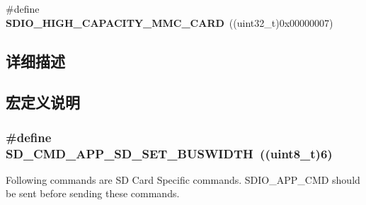 \begin{DoxyCompactItemize}
\item 
\#define {\bfseries S\+D\+I\+O\+\_\+\+H\+I\+G\+H\+\_\+\+C\+A\+P\+A\+C\+I\+T\+Y\+\_\+\+M\+M\+C\+\_\+\+C\+A\+RD}~((uint32\+\_\+t)0x00000007)\hypertarget{group___s_t_m324x_g___e_v_a_l___s_d_i_o___s_d___exported___constants_ga1551b2950a3d0c5fa148957b4f169d0d}{}\label{group___s_t_m324x_g___e_v_a_l___s_d_i_o___s_d___exported___constants_ga1551b2950a3d0c5fa148957b4f169d0d}

\end{DoxyCompactItemize}


\subsection{详细描述}


\subsection{宏定义说明}
\subsubsection[{\texorpdfstring{S\+D\+\_\+\+C\+M\+D\+\_\+\+A\+P\+P\+\_\+\+S\+D\+\_\+\+S\+E\+T\+\_\+\+B\+U\+S\+W\+I\+D\+TH}{SD_CMD_APP_SD_SET_BUSWIDTH}}]{\setlength{\rightskip}{0pt plus 5cm}\#define S\+D\+\_\+\+C\+M\+D\+\_\+\+A\+P\+P\+\_\+\+S\+D\+\_\+\+S\+E\+T\+\_\+\+B\+U\+S\+W\+I\+D\+TH~((uint8\+\_\+t)6)}\hypertarget{group___s_t_m324x_g___e_v_a_l___s_d_i_o___s_d___exported___constants_ga1b28ab176d0d05d7f971809aeb07b758}{}\label{group___s_t_m324x_g___e_v_a_l___s_d_i_o___s_d___exported___constants_ga1b28ab176d0d05d7f971809aeb07b758}


Following commands are SD Card Specific commands. S\+D\+I\+O\+\_\+\+A\+P\+P\+\_\+\+C\+MD should be sent before sending these commands. 

